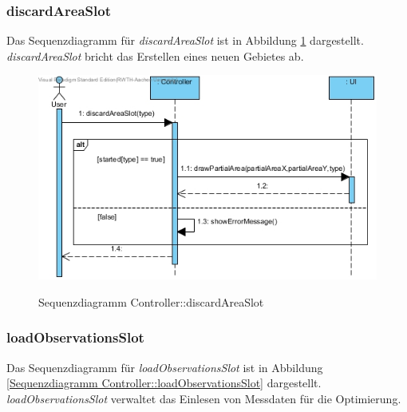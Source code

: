 \subsubsection*{discardAreaSlot}

Das Sequenzdiagramm für \emph{discardAreaSlot} ist in Abbildung \ref{Sequenzdiagramm Controller::discardAreaSlot} dargestellt. \emph{discardAreaSlot} bricht das Erstellen eines neuen Gebietes ab.

\begin{figure}[H]
	\centering
	\includegraphics[scale=.85]{Bilder/Controller__discardAreaSlot().jpg}\\
	\caption{Sequenzdiagramm Controller::discardAreaSlot}
	\label{Sequenzdiagramm Controller::discardAreaSlot}
\end{figure}

\subsubsection*{loadObservationsSlot}

Das Sequenzdiagramm für \emph{loadObservationsSlot} ist in Abbildung \ref{Sequenzdiagramm Controller::loadObservationsSlot} dargestellt. \emph{loadObservationsSlot} verwaltet das Einlesen von Messdaten für die Optimierung.

